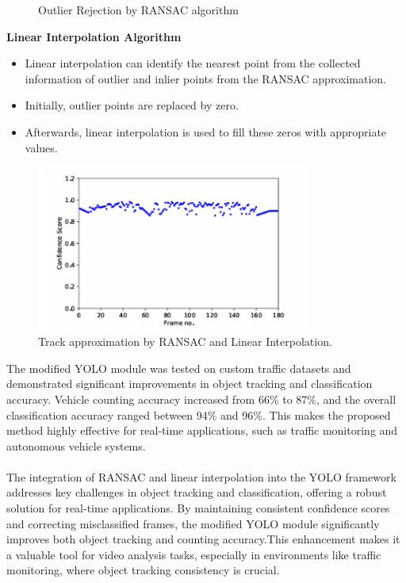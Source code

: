 {\begin{figure}[h!]
    \caption{Outlier Rejection by RANSAC algorithm}
\end{figure}
%
%
\textbf{Linear Interpolation Algorithm}
\begin{itemize}
    \item Linear interpolation can identify the nearest point from the collected information of outlier and inlier points from the RANSAC approximation.
    \item Initially, outlier points are replaced by zero.
    \item Afterwards, linear interpolation is used to fill these zeros with appropriate values.
\end{itemize}
%
%
\begin{figure}[h!]
    \centering
    \includegraphics[width=0.8\textwidth]{images/Linear Interpolation.png}
    \caption{Track approximation by RANSAC and Linear Interpolation.}
\end{figure}
%
%
The modified YOLO module was tested on custom traffic datasets and demonstrated significant improvements in object tracking and classification accuracy. Vehicle counting accuracy increased from 66\% to 87\%, and the overall classification accuracy ranged between 94\% and 96\%. This makes the proposed method highly effective for real-time applications, such as traffic monitoring and autonomous vehicle systems.\\\\
%
The integration of RANSAC and linear interpolation into the YOLO framework addresses key challenges in object tracking and classification, offering a robust solution for real-time applications. By maintaining consistent confidence scores and correcting misclassified frames, the modified YOLO module significantly improves both object tracking and counting accuracy.This enhancement makes it a valuable tool for video analysis tasks, especially in environments like traffic monitoring, where object tracking consistency is crucial.\\\\
}
